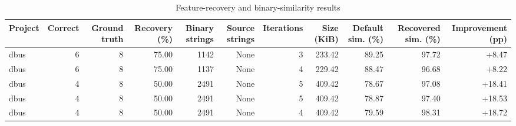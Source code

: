 \begin{table}[htbp]
\centering
\caption{Feature-recovery and binary-similarity results}
\label{tab:feature-recovery-results}
\small
\begin{tabular}{lrrrrrrrrrr}
\toprule
Project & Correct & Ground truth & Recovery (\%) & Binary strings & Source strings & Iterations & Size (KiB) & Default sim. (\%) & Recovered sim. (\%) & Improvement (pp) \\
\midrule
dbus & 6 & 8 & 75.00 & 1142 & None & 3 & 233.42 & 89.25 & 97.72 & +8.47 \\
dbus & 6 & 8 & 75.00 & 1137 & None & 4 & 229.42 & 88.47 & 96.68 & +8.22 \\
dbus & 4 & 8 & 50.00 & 2491 & None & 5 & 409.42 & 78.67 & 97.08 & +18.41 \\
dbus & 4 & 8 & 50.00 & 2491 & None & 5 & 409.42 & 78.87 & 97.40 & +18.53 \\
dbus & 4 & 8 & 50.00 & 2491 & None & 4 & 409.42 & 79.59 & 98.31 & +18.72 \\
\bottomrule
\end{tabular}
\end{table}
